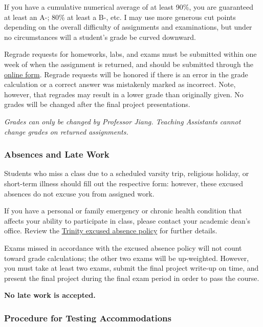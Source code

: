 \documentclass[
]{article}
\begin{document}
If you have a cumulative numerical average of at least 90\%, you are
guaranteed at least an A-; 80\% at least a B-, etc. I may use more
generous cut points depending on the overall difficulty of assignments
and examinations, but under no circumstances will a student's grade be
curved downward.

Regrade requests for homeworks, labs, and exams must be submitted within
one week of when the assignment is returned, and should be submitted
through the \href{link\%20goes\%20here}{online form}. Regrade requests
will be honored if there is an error in the grade calculation or a
correct answer was mistakenly marked as incorrect. Note, however, that
regrades may result in a lower grade than originally given. No grades
will be changed after the final project presentations.

\emph{Grades can only be changed by Professor Jiang. Teaching Assistants
cannot change grades on returned assignments.}

\hypertarget{absences-and-late-work}{%
\subsubsection{Absences and Late Work}\label{absences-and-late-work}}

Students who miss a class due to a scheduled varsity trip, religious
holiday, or short-term illness should fill out the respective form:
however, these excused absences do not excuse you from assigned work.

If you have a personal or family emergency or chronic health condition
that affects your ability to participate in class, please contact your
academic dean's office. Review the
\href{https://trinity.duke.edu/undergraduate/academic-policies/class-attendance-and-missed-work}{Trinity
excused absence policy} for further details.

Exams missed in accordance with the excused absence policy will not
count toward grade calculations; the other two exams will be
up-weighted. However, you must take at least two exams, submit the final
project write-up on time, and present the final project during the final
exam period in order to pass the course.

\textbf{No late work is accepted.}

\hypertarget{procedure-for-testing-accommodations}{%
\subsubsection{Procedure for Testing
Accommodations}\label{procedure-for-testing-accommodations}}
\end{document}
